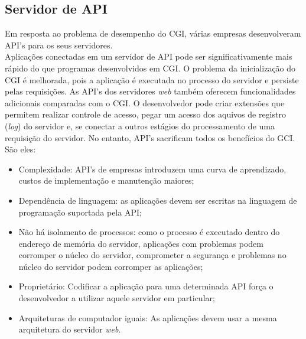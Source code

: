 \subsection{Servidor de API}
Em resposta ao problema de desempenho do CGI, várias empresas desenvolveram API's para os seus servidores.\\
Aplicações conectadas em um servidor de API pode ser significativamente mais 
rápido do que programas desenvolvidos em CGI. O problema da inicialização do 
CGI é melhorada, pois a aplicação é executada no processo do servidor e 
persiste pelas requisições. As API's dos servidores \textit{web} também 
oferecem funcionalidades adicionais comparadas com o CGI. O desenvolvedor pode 
criar extensões que permitem realizar controle de acesso, pegar um acesso dos 
aquivos de registro (\textit{log}) do servidor e, se conectar a outros estágios 
do processamento de uma requisição do servidor. No entanto, API's sacrificam 
todos os benefícios do GCI. São eles:
\begin{itemize}
	\item Complexidade: API's de empresas introduzem uma curva de aprendizado, 
	custos de implementação e manutenção maiores;
	\item Dependência de linguagem: as aplicações devem ser escritas na 
	linguagem de programação suportada pela API;
	\item Não há isolamento de processos: como o processo é executado dentro do 
	endereço de memória do servidor, aplicações com problemas podem corromper o 
	núcleo do servidor, comprometer a segurança e problemas no núcleo do 
	servidor podem corromper as aplicações;
	\item Proprietário: Codificar a aplicação para uma determinada API força o desenvolvedor a utilizar aquele servidor em particular;
	\item Arquiteturas de computador iguais: As aplicações devem usar a mesma 
	arquitetura do servidor \textit{web}.
\end{itemize}
